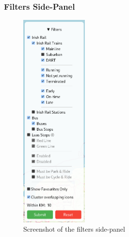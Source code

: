 \documentclass[a4paper,11pt]{report}
\begin{document}
\subsubsection{Filters Side-Panel}\label{sec:filters_side_panel}
\begin{figure}[H]
    \centering
    \includegraphics[width=0.3\textwidth]{./images/filterspanel.png}
    \caption{Screenshot of the filters side-panel}
\end{figure}
\end{document}

